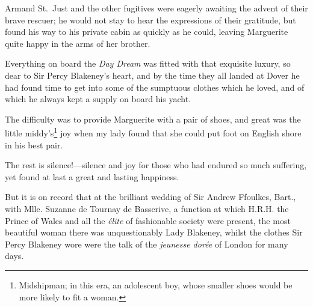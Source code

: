 \documentclass[paper=5.5in:8.5in,BCOR=7mm,twoside,DIV=calc,12pt,usegeometry,chapterprefix,endperiod,headings=big]{scrbook}
\begin{document}
Armand St.~Just and the other fugitives were eagerly awaiting the advent of their brave rescuer; he would not stay to hear the expressions of their gratitude, but found his way to his private cabin as quickly as he could, leaving Marguerite quite happy in the arms of her brother.

Everything on board the \textit{Day Dream} was fitted with that exquisite luxury, so dear to Sir Percy Blakeney's heart, and by the time they all landed at Dover he had found time to get into some of the sumptuous clothes which he loved, and of which he always kept a supply on board his yacht.

The difficulty was to provide Marguerite with a pair of shoes, and great was the little middy's\footnote{Midshipman; in this era, an adolescent boy, whose smaller shoes would be more likely to fit a woman.} joy when my lady found that she could put foot on English shore in his best pair.

The rest is silence!---silence and joy for those who had endured so much suffering, yet found at last a great and lasting happiness.

But it is on record that at the brilliant wedding of Sir Andrew Ffoulkes, Bart., with Mlle. Suzanne de Tournay de Basserive, a function at which H.R.H. the Prince of Wales and all the \textit{élite} of fashionable society were present, the most beautiful woman there was unquestionably Lady Blakeney, whilst the clothes Sir Percy Blakeney wore were the talk of the \textit{jeunesse dorée} of London for many days.
\end{document}
